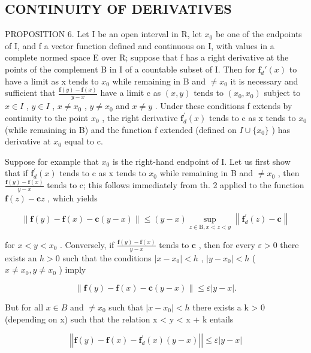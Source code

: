 \subsection{CONTINUITY OF DERIVATIVES}

PROPOSITION 6. Let I be an open interval in R, let \(x_0\) be one of the endpoints of I, and f a vector function defined and continuous on I, with values in a complete normed space E over R; suppose that f has a right derivative at the points of the complement B in I of a countable subset of I. Then for \(\mathbf{f}_d'(x)\) to have a limit as x tends to \(x_0\) while remaining in B and \(\neq x_0\) it is necessary and sufficient that \(\frac{\mathbf{f}(y) - \mathbf{f}(x)}{y - x}\) have a limit c as \((x, y)\) tends to \((x_0, x_0)\) subject to \(x \in I\) , \(y \in I\) , \(x \neq x_0\) , \(y \neq x_0\) and \(x \neq y\) . Under these conditions f extends by continuity to the point \(x_0\) , the right derivative \(\mathbf{f}_{d}^{\prime}(x)\) tends to c as x tends to \(x_{0}\) (while remaining in B) and the function f extended (defined on \(I \cup \{x_{0}\}\) ) has derivative at \(x_{0}\) equal to c.

Suppose for example that \(x_{0}\) is the right-hand endpoint of I. Let us first show that if \(\mathbf{f}_{d}^{\prime}(x)\) tends to c as x tends to \(x_{0}\) while remaining in B and \(\neq x_{0}\) , then \(\frac{\mathbf{f}(y)-\mathbf{f}(x)}{y-x}\) tends to c; this follows immediately from th. 2 applied to the function \(\mathbf{f}(z)-\mathbf{c}z\) , which yields

\[
\| \mathbf {f} (y) - \mathbf {f} (x) - \mathbf {c} (y - x) \| \leqslant (y - x) \sup _ {z \in \mathrm{B}, x <   z <   y} \left\| \mathbf {f} _ {d} ^ {\prime} (z) - \mathbf {c} \right\|
\]

for \(x < y < x_0\) . Conversely, if \(\frac{\mathbf{f}(y) - \mathbf{f}(x)}{y - x}\) tends to \(\mathbf{c}\) , then for every \(\varepsilon > 0\) there exists an \(h > 0\) such that the conditions \(|x - x_0| < h\) , \(|y - x_0| < h\) ( \(x \neq x_0, y \neq x_0\) ) imply

\[
\left\| \mathbf {f} (y) - \mathbf {f} (x) - \mathbf {c} (y - x) \right\| \leqslant \varepsilon | y - x |.\tag{11}
\]

But for all \(x \in B\) and \(\neq x_{0}\) such that \(|x - x_{0}| < h\) there exists a k \textgreater{} 0 (depending on x) such that the relation x \textless{} y \textless{} x + k entails

\[
\left| \left| \mathbf {f} (y) - \mathbf {f} (x) - \mathbf {f} _ {d} ^ {\prime} (x) (y - x) \right| \right| \leqslant \varepsilon | y - x |\tag{12}
\]


